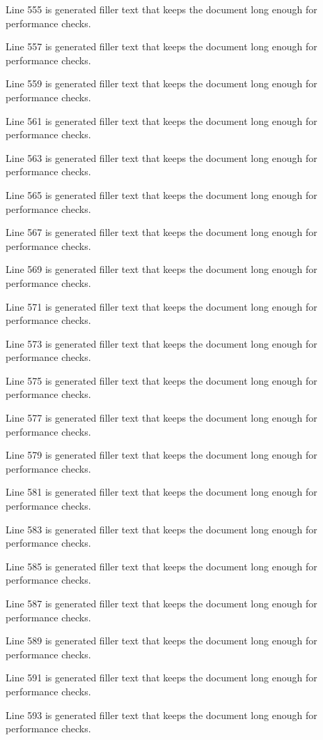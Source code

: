 Line 555 is generated filler text that keeps the document long enough for performance checks.

Line 557 is generated filler text that keeps the document long enough for performance checks.

Line 559 is generated filler text that keeps the document long enough for performance checks.

Line 561 is generated filler text that keeps the document long enough for performance checks.

Line 563 is generated filler text that keeps the document long enough for performance checks.

Line 565 is generated filler text that keeps the document long enough for performance checks.

Line 567 is generated filler text that keeps the document long enough for performance checks.

Line 569 is generated filler text that keeps the document long enough for performance checks.

Line 571 is generated filler text that keeps the document long enough for performance checks.

Line 573 is generated filler text that keeps the document long enough for performance checks.

Line 575 is generated filler text that keeps the document long enough for performance checks.

Line 577 is generated filler text that keeps the document long enough for performance checks.

Line 579 is generated filler text that keeps the document long enough for performance checks.

Line 581 is generated filler text that keeps the document long enough for performance checks.

Line 583 is generated filler text that keeps the document long enough for performance checks.

Line 585 is generated filler text that keeps the document long enough for performance checks.

Line 587 is generated filler text that keeps the document long enough for performance checks.

Line 589 is generated filler text that keeps the document long enough for performance checks.

Line 591 is generated filler text that keeps the document long enough for performance checks.

Line 593 is generated filler text that keeps the document long enough for performance checks.

